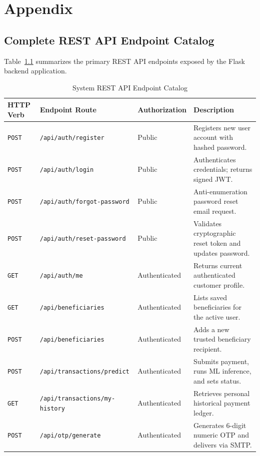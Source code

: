 \chapter{Appendix}
\label{chap:appendix}

\section{Complete REST API Endpoint Catalog}
Table~\ref{tab:api_catalog} summarizes the primary REST API endpoints exposed by the Flask backend application.

\begin{table}[h]
\centering
\caption{System REST API Endpoint Catalog}
\label{tab:api_catalog}
\begin{tabularx}{\textwidth}{llp{3.2cm}X}
\toprule
\textbf{HTTP Verb} & \textbf{Endpoint Route} & \textbf{Authorization} & \textbf{Description} \\
\midrule
\texttt{POST} & \texttt{/api/auth/register} & Public & Registers new user account with hashed password. \\
\texttt{POST} & \texttt{/api/auth/login} & Public & Authenticates credentials; returns signed JWT. \\
\texttt{POST} & \texttt{/api/auth/forgot-password} & Public & Anti-enumeration password reset email request. \\
\texttt{POST} & \texttt{/api/auth/reset-password} & Public & Validates cryptographic reset token and updates password. \\
\texttt{GET} & \texttt{/api/auth/me} & Authenticated & Returns current authenticated customer profile. \\
\texttt{GET} & \texttt{/api/beneficiaries} & Authenticated & Lists saved beneficiaries for the active user. \\
\texttt{POST} & \texttt{/api/beneficiaries} & Authenticated & Adds a new trusted beneficiary recipient. \\
\texttt{POST} & \texttt{/api/transactions/predict} & Authenticated & Submits payment, runs ML inference, and sets status. \\
\texttt{GET} & \texttt{/api/transactions/my-history} & Authenticated & Retrieves personal historical payment ledger. \\
\texttt{POST} & \texttt{/api/otp/generate} & Authenticated & Generates 6-digit numeric OTP and delivers via SMTP. \\

\end{tabularx}
\end{table}
